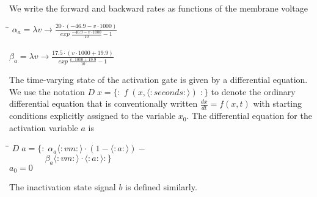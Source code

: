 \documentclass[11pt]{article}
\newlength{\lwidth}\setlength{\lwidth}{4.5cm}
\newlength{\cwidth}\setlength{\cwidth}{8mm} %
\newcommand{\Conid}[1]{\mathit{#1}}
\newcommand{\Varid}[1]{\mathit{#1}}
\begin{document}
We write the forward and backward rates as functions of the membrane voltage

\begin{tabbing}
\qquad\=\hspace{\lwidth}\=\hspace{\cwidth}\=\+\kill
${\alpha_a\mathrel{=}\lambda \Varid{v}\to \frac{\mathrm{20}\!\cdot\!(\mathbin{-}\mathrm{46.9}\mathbin{-}\Varid{v}\!\cdot\!\mathrm{1000})}{\Varid{exp}\;\frac{\mathbin{-}\mathrm{46.9}\mathbin{-}\Varid{v}\!\cdot\!\mathrm{1000}}{\mathrm{10}}\mathbin{-}\mathrm{1}}}$\\
\\
${\beta_a\mathrel{=}\lambda \Varid{v}\to \frac{\mathrm{17.5}\!\cdot\!(\Varid{v}\!\cdot\!\mathrm{1000}\mathbin{+}\mathrm{19.9})}{\Varid{exp}\;\frac{\Varid{v}\!\cdot\!\mathrm{1000}\mathbin{+}\mathrm{19.9}}{\mathrm{10}}\mathbin{-}\mathrm{1}}}$
\end{tabbing}

%

The time-varying state of the activation gate is given by a
differential equation. We use the notation \ensuremath{\Conid{D}\;\Varid{x}\mathrel{=}\{\!:\!\;\Varid{f}\;(\Varid{x},\langle:\Varid{seconds}:\rangle)\;\!:\!\}} to denote the ordinary differential equation
that is conventionally written $\frac{dx}{dt} = f(x,t) $ with starting
conditions explicitly assigned to the variable $x_0$. The
differential equation for the activation variable $a$ is
\begin{tabbing}
\qquad\=\hspace{\lwidth}\=\hspace{\cwidth}\=\+\kill
${\Conid{D}\;\Varid{a}\mathrel{=}\{\!:\!\;\alpha_a\langle:\Varid{vm}:\rangle\!\cdot\!(\mathrm{1}\mathbin{-}\langle:\Varid{a}:\rangle)\mathbin{-}}$\\
${\phantom{\Conid{D}\;\Varid{a}\mathrel{=}\{\!:\!\;\mbox{}}\beta_a\langle:\Varid{vm}:\rangle\!\cdot\!\langle:\Varid{a}:\rangle\!:\!\}}$\\
${a_0\mathrel{=}\mathrm{0}}$
\end{tabbing}The inactivation state signal \ensuremath{\Varid{b}} is defined similarly.
\end{document}

